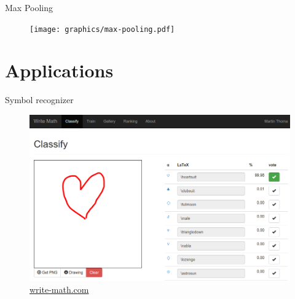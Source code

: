 \documentclass{beamer}
\begin{document}
\begin{frame}{Max Pooling}
\begin{figure}[ht]
    \centering
    \texttt{[image: graphics/max-pooling.pdf]}
\end{figure}
\end{frame}

\section{Applications}
\begin{frame}{Symbol recognizer}
\begin{figure}[ht]
    \centering
    \includegraphics[width=0.8\paperwidth, height=0.7\paperheight, keepaspectratio]{graphics/symbol-recognizer.png}
    \captionsetup{labelformat=empty}
    \caption{\href{http://write-math.com}{write-math.com}}
\end{figure}
\end{frame}

\end{document}
